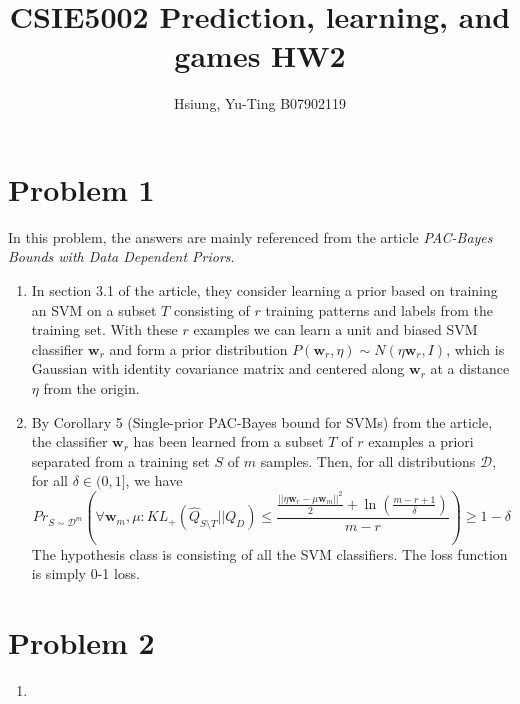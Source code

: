 \documentclass[a4paper, 12pt]{article}
\title{CSIE5002 Prediction, learning, and games HW2}
\author{Hsiung, Yu-Ting B07902119}
\begin{document}
\maketitle

\section*{Problem 1}

In this problem, the answers are mainly referenced from the article \textit{PAC-Bayes Bounds with Data Dependent Priors}\cite{parrado2012pac}.

\begin{enumerate}
    \item In section 3.1 of the article, they consider learning a prior based on training an SVM on a subset $T$ consisting of $r$ training patterns and labels from the training set. With these $r$ examples we can learn a unit and biased SVM classifier $\mathbf{w}_r$ and form a prior distribution $P(\mathbf{w}_r, \eta) \sim N(\eta \mathbf{w}_r, I)$, which is Gaussian with identity covariance matrix and centered along $\mathbf{w}_r$ at a distance $\eta$ from the origin.

    \item By Corollary 5 (Single-prior PAC-Bayes bound for SVMs) from the article, the classifier $\mathbf{w}_r$ has been learned from a subset $T$ of $r$ examples a priori separated from a training set $S$ of $m$ samples. Then, for all distributions $\mathcal{D}$, for
          all $\delta \in (0,1]$, we have
          \[Pr_{S \sim \mathcal{D}^m} \left( \forall \mathbf{w}_m, \mu: KL_+(\hat{Q}_{S\setminus T }|| Q_D) \leq \frac{\frac{||\eta \mathbf{w}_r - \mu \mathbf{w}_m||^2}{2}+\ln(\frac{m-r+1}{\delta})}{m-r}\right) \geq 1 - \delta\]
          The hypothesis class is consisting of all the SVM classifiers. The loss function is simply 0-1 loss.
\end{enumerate}

\section*{Problem 2}
\begin{enumerate}
    \item
\end{enumerate}

\printbibliography
\end{document}
